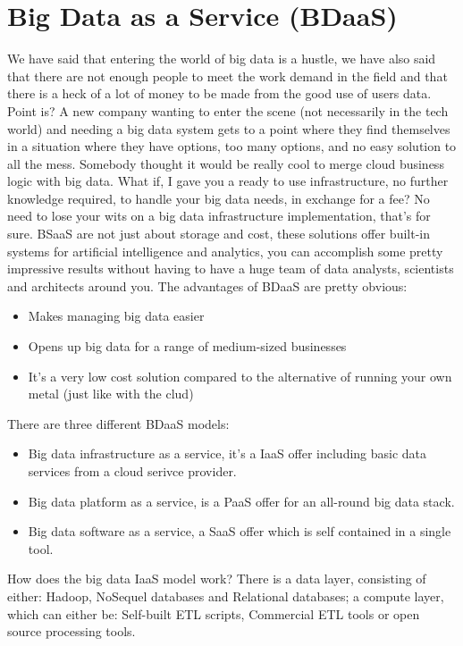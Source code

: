 \section{Big Data as a Service (BDaaS)}
We have said that entering the world of big data is a hustle, we have also said that there are not enough people to meet the work demand in the field and that there is a heck of a lot of money to be made from the good use of users data. \n
Point is? \n
A new company wanting to enter the scene (not necessarily in the tech world) and needing a big data system gets to a point where they find themselves in a situation where they have options, too many options, and no easy solution to all the mess. \n
Somebody thought it would be really cool to merge cloud business logic with big data. What if, I gave you a ready to use infrastructure, no further knowledge required, to handle your big data needs, in exchange for a fee? No need to lose your wits on a big data infrastructure implementation, that's for sure. \n
BSaaS are not just about storage and cost, these solutions offer built-in systems for artificial intelligence and analytics, you can accomplish some pretty impressive results without having to have a huge team of data analysts, scientists and architects around you. \n
The advantages of BDaaS are pretty obvious:
\begin{itemize}
    \item Makes managing big data easier
    \item Opens up big data for a range of medium-sized businesses
    \item It's a very low cost solution compared to the alternative of running your own metal (just like with the clud)
\end{itemize}
There are three different BDaaS models:
\begin{itemize}
    \item Big data infrastructure as a service, it's a IaaS offer including basic data services from a cloud serivce provider.
    \item Big data platform as a service, is a PaaS offer for an all-round big data stack.
    \item Big data software as a service, a SaaS offer which is self contained in a single tool.
\end{itemize}
How does the big data IaaS model work? There is a data layer, consisting of either: Hadoop, NoSequel databases and Relational databases; a compute layer, which can either be: Self-built ETL scripts, Commercial ETL tools or open source processing tools. \n
